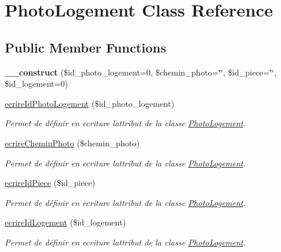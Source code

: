 \hypertarget{class_photo_logement}{}\section{Photo\+Logement Class Reference}
\label{class_photo_logement}
\subsection*{Public Member Functions}
\begin{DoxyCompactItemize}
\item 
\mbox{\label{class_photo_logement_a7f7b59f02d3fdbdcdcbb8827bbe4f864}} 
{\bfseries \+\_\+\+\_\+construct} (\$id\+\_\+photo\+\_\+logement=0, \$chemin\+\_\+photo=\char`\"{}\char`\"{}, \$id\+\_\+piece=\char`\"{}\char`\"{}, \$id\+\_\+logement=0)
\item 
\hyperlink{class_photo_logement_aaddea43f3f8bcc08258ef45fe4c02f0a}{ecrire\+Id\+Photo\+Logement} (\$id\+\_\+photo\+\_\+logement)
\begin{DoxyCompactList}\small\item\em Permet de définir en ecriture l\textquotesingle{}attribut de la classe \hyperlink{class_photo_logement}{Photo\+Logement}. \end{DoxyCompactList}\item 
\hyperlink{class_photo_logement_ad5c888eb9b577273febb80af601e3ef2}{ecrire\+Chemin\+Photo} (\$chemin\+\_\+photo)
\begin{DoxyCompactList}\small\item\em Permet de définir en ecriture l\textquotesingle{}attribut de la classe \hyperlink{class_photo_logement}{Photo\+Logement}. \end{DoxyCompactList}\item 
\hyperlink{class_photo_logement_a1853eb65004ffac8c6fe881be6492bb1}{ecrire\+Id\+Piece} (\$id\+\_\+piece)
\begin{DoxyCompactList}\small\item\em Permet de définir en ecriture l\textquotesingle{}attribut de la classe \hyperlink{class_photo_logement}{Photo\+Logement}. \end{DoxyCompactList}\item 
\hyperlink{class_photo_logement_a9baa4faf1032ad32f4a0be047689fd4c}{ecrire\+Id\+Logement} (\$id\+\_\+logement)
\begin{DoxyCompactList}\small\item\em Permet de définir en ecriture l\textquotesingle{}attribut de la classe \hyperlink{class_photo_logement}{Photo\+Logement}. \end{DoxyCompactList}\item 

\end{DoxyCompactItemize}
